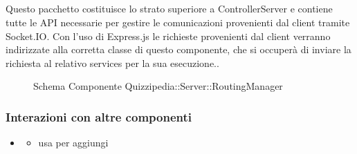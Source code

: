 \subsection{}
Questo pacchetto costituisce lo strato superiore a ControllerServer e contiene tutte le API necessarie per gestire le comunicazioni provenienti dal client tramite Socket.IO. 
Con l'uso di Express.js le richieste provenienti dal client verranno indirizzate alla corretta classe di questo componente, che si occuperà di inviare la richiesta al relativo services per la sua esecuzione..
\begin{figure}[H]
\centering
\noindent{}
\caption[Schema Componente Quizzipedia::Server::RoutingManager]{Schema Componente Quizzipedia::Server::RoutingManager}
\end{figure}
\subsubsection{Interazioni con altre componenti}
\begin{itemize}
\item {}
\begin{itemize}
\item usa  per aggiungi
\end{itemize}
\end{itemize}
